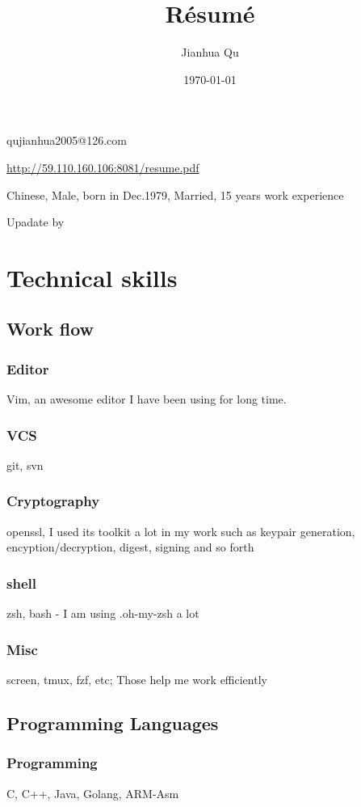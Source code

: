 \documentclass{article}
\makeatletter
\renewcommand{\maketitle}{
\begin{center}

{\huge\bfseries\theauthor}

\vspace{.25em}
qujianhua2005@126.com

\vspace{.25em}
\url {http://59.110.160.106:8081/resume.pdf}

\vspace{.25em}
Chinese, Male, born in Dec.1979, Married, 15 years work experience

\vspace{.25em}
Upadate by \thedate

\end{center}
}
\makeatother
\begin{document}
\title {R\'esum\'e}
\author {Jianhua Qu}
\date{\today}

\maketitle

\section{Technical skills}

\subsection{Work flow}
\subsubsection{Editor}
Vim, an awesome editor I have been using for long time.

\subsubsection{VCS}
git, svn

\subsubsection{Cryptography}
openssl, I used its toolkit a lot in my work such as keypair generation,
        encyption/decryption, digest, signing and so forth

\subsubsection{shell}
zsh, bash - I am using .oh-my-zsh a lot

\subsubsection{Misc}
screen, tmux, fzf, etc;
Those help me work efficiently

\subsection{Programming Languages}

\subsubsection{Programming}
C, C++, Java, Golang, ARM-Asm
\end{document}
